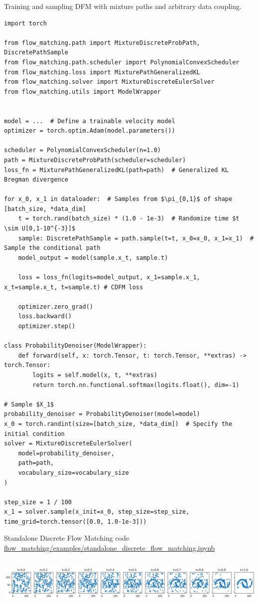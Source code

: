 \documentclass{fairmeta}
\numberwithin{equation}{section}
\begin{document}
\begin{pbox}[label={ex:dfm_train}]{Training and sampling DFM with mixture paths and arbitrary data coupling.}
\begin{verbatim}
import torch

from flow_matching.path import MixtureDiscreteProbPath, DiscretePathSample
from flow_matching.path.scheduler import PolynomialConvexScheduler
from flow_matching.loss import MixturePathGeneralizedKL
from flow_matching.solver import MixtureDiscreteEulerSolver
from flow_matching.utils import ModelWrapper


model = ...  # Define a trainable velocity model
optimizer = torch.optim.Adam(model.parameters())

scheduler = PolynomialConvexScheduler(n=1.0)
path = MixtureDiscreteProbPath(scheduler=scheduler)
loss_fn = MixturePathGeneralizedKL(path=path)  # Generalized KL Bregman divergence

for x_0, x_1 in dataloader:  # Samples from $\pi_{0,1}$ of shape [batch_size, *data_dim]
    t = torch.rand(batch_size) * (1.0 - 1e-3)  # Randomize time $t \sim U[0,1-10^{-3}]$
    sample: DiscretePathSample = path.sample(t=t, x_0=x_0, x_1=x_1)  # Sample the conditional path 
    model_output = model(sample.x_t, sample.t)

    loss = loss_fn(logits=model_output, x_1=sample.x_1, x_t=sample.x_t, t=sample.t) # CDFM loss
    
    optimizer.zero_grad()  
    loss.backward()
    optimizer.step()

class ProbabilityDenoiser(ModelWrapper):
    def forward(self, x: torch.Tensor, t: torch.Tensor, **extras) -> torch.Tensor:
        logits = self.model(x, t, **extras)
        return torch.nn.functional.softmax(logits.float(), dim=-1)

# Sample $X_1$
probability_denoiser = ProbabilityDenoiser(model=model)
x_0 = torch.randint(size=[batch_size, *data_dim])  # Specify the initial condition
solver = MixtureDiscreteEulerSolver(
    model=probability_denoiser, 
    path=path, 
    vocabulary_size=vocabulary_size
)

step_size = 1 / 100
x_1 = solver.sample(x_init=x_0, step_size=step_size, time_grid=torch.tensor([0.0, 1.0-1e-3]))
\end{verbatim}
\end{pbox}


\begin{pbox}[label={ex:fm_discrete_standalone}]{Standalone Discrete Flow Matching code \\ \url{flow_matching/examples/standalone_discrete_flow_matching.ipynb}}
\inputminted{python}{assets/discrete_demo.tex}
\vspace{0.5cm}
\includegraphics[width=\textwidth]{assets/discrete_moons.png}
\end{pbox}
\end{document}

